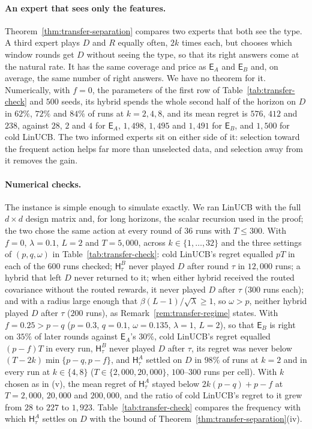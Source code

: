 \documentclass{article}
\theoremstyle{definition}
\theoremstyle{remark}
\theoremstyle{remark}
\newcommand{\Exp}{\mathsf{E}}
\newcommand{\Hyb}{\mathsf{H}}
\begin{document}
\paragraph{An expert that sees only the features.}
Theorem~\ref{thm:transfer-separation} compares two experts that both see the
type. A third expert plays $D$ and $R$ equally often, $2k$ times each, but
chooses which window rounds get $D$ without seeing the type, so that its right
answers come at the natural rate. It has the same coverage and price as
$\Exp_A$ and $\Exp_B$ and, on average, the same number of right answers. We
have no theorem for it. Numerically, with $f=0$, the parameters of the first row of
Table~\ref{tab:transfer-check} and $500$ seeds, its hybrid spends the whole
second half of the horizon on $D$ in $62\%$, $72\%$ and $84\%$ of runs at
$k=2,4,8$, and its mean regret is $576$, $412$ and $238$, against $28$, $2$
and $4$ for $\Exp_A$, $1{,}498$, $1{,}495$ and $1{,}491$ for $\Exp_B$, and
$1{,}500$ for cold LinUCB. The two informed experts sit on either side of it:
selection toward the frequent action helps far more than unselected data, and
selection away from it removes the gain.

\paragraph{Numerical checks.}
The instance is simple enough to simulate exactly. We ran LinUCB with the full
$d\times d$ design matrix and, for long horizons, the scalar recursion used in
the proof; the two chose the same action at every round of $36$ runs with
$T\le300$. With $f=0$, $\lambda=0.1$, $L=2$ and $T=5{,}000$, across $k\in\{1,\dots,32\}$
and the three settings of $(p,q,\omega)$ in Table~\ref{tab:transfer-check}: cold
LinUCB's regret equalled $pT$ in each of the $600$ runs checked;
$\Hyb^B_\tau$ never played $D$ after round $\tau$ in $12{,}000$ runs; a hybrid
that left $D$ never returned to it; when either hybrid received the routed
covariance without the routed rewards, it never played $D$ after $\tau$
($300$ runs each); and with a radius large enough that
$\beta(L-1)/\sqrt\lambda\ge1$, so $\omega>p$, neither hybrid played $D$
after $\tau$ ($200$ runs), as Remark~\ref{rem:transfer-regime} states. With
$f=0.25>p-q$ ($p=0.3$, $q=0.1$, $\omega=0.135$, $\lambda=1$, $L=2$), so that
$\Exp_B$ is right on $35\%$ of later rounds against $\Exp_A$'s $30\%$, cold
LinUCB's regret equalled $(p-f)T$ in every run, $\Hyb^B_\tau$ never played $D$
after $\tau$, its regret was never below $(T-2k)\min\{p-q,p-f\}$, and
$\Hyb^A_\tau$ settled on $D$ in $98\%$ of runs at $k=2$ and in every run at
$k\in\{4,8\}$ ($T\in\{2{,}000,20{,}000\}$, $100$--$300$ runs per cell). With $k$
chosen as in (v), the mean regret of $\Hyb^A_\tau$ stayed below
$2k(p-q)+p-f$ at $T=2{,}000$, $20{,}000$ and $200{,}000$, and the ratio of
cold LinUCB's regret to it grew from $28$ to $227$ to $1{,}923$.
Table~\ref{tab:transfer-check} compares the frequency with which
$\Hyb^A_\tau$ settles on $D$ with the bound of
Theorem~\ref{thm:transfer-separation}(iv).
\end{document}
